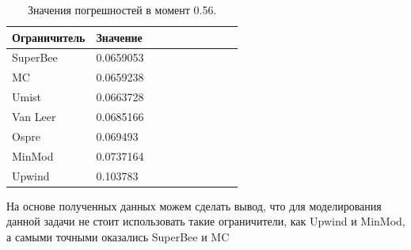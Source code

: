 \begin{table}[tp!]
\centering
\caption {Значения погрешностей в момент 0.56.}
\label{tab:norms}
\begin{tabular}{|l|l|c|c|c|c|c|c|c|c|}
\hline
Ограничитель & Значение \\
\hline
SuperBee & 0.0659053\\
\hline
MC &  0.0659238\\
\hline
Umist & 0.0663728\\
\hline
Van Leer & 0.0685166\\
\hline
Ospre &  0.069493\\
\hline
MinMod & 0.0737164\\
\hline
Upwind  & 0.103783\\
\hline
\end{tabular}
\end{table}


На основе полученных данных можем сделать вывод, что для моделирования данной задачи не стоит использовать такие ограничители, как
Upwind и MinMod, а самыми точными оказались SuperBee и MC
